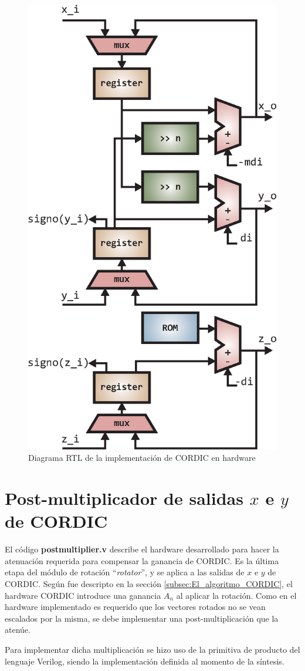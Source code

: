 \begin{figure}[!h]
 	\begin{center}
 		\includegraphics[width=7 cm]{./figures/C04-cordic_hardware}
 		\caption{Diagrama RTL de la implementación de CORDIC en hardware}
		\label{fig:cordic_hardware}
 	\end{center}
\end{figure}

\section{Post-multiplicador de salidas $x$ e $y$ de CORDIC}

El código \textbf{postmultiplier.v} describe el hardware desarrollado para hacer la atenuación requerida para compensar la ganancia de CORDIC. Es la última etapa del módulo de rotación ``\textit{rotator}'', y se aplica a las salidas de $x$ e $y$ de CORDIC. Según fue descripto en la sección \ref{subsec:El_algoritmo_CORDIC}, el hardware CORDIC introduce una ganancia $A_n$ al aplicar la rotación. Como en el hardware implementado es requerido que los vectores rotados no se vean escalados por la misma, se debe implementar una post-multiplicación que la atenúe.

Para implementar dicha multiplicación se hizo uso de la primitiva de producto del lenguaje Verilog, siendo la implementación definida al momento de la síntesis.

